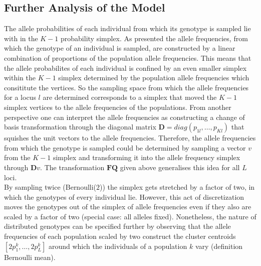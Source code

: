 \documentclass[a4paper, 11pt]{article}
\begin{document}
\subsection{Further Analysis of the Model}
The allele probabilities of each individual from which its genotype is sampled lie with in the $K-1$ probability simplex. As presented the allele frequencies, from which the genotype of an individual is sampled, are constructed by a linear combination of proportions of the population allele frequencies. This means that the allele probabilites of each individual is confined by an even smaller simplex within the $K-1$ simplex determined by the population allele frequencies which consititute the vertices. So the sampling space from which the allele frequencies for a locus $l$ are determined corresponds to a simplex that moved the $K-1$ simplex vertices to the allele frequencies of the populations. From another perspective one can interpret the allele frequencies as constructing a change of basis transformation through the diagonal matrix $\mathbf{D} = diag(p_{1l}, \ldots, p_{Kl})$ that squishes the unit vectors to the allele frequencies. Therefore, the allele frequencies from which the genotype is sampled could be determined by sampling a vector $v$ from the $K-1$ simplex and transforming it into the allele frequency simplex through $\mathbf{D}v$.  The transformation $\mathbf{F}\mathbf{Q}$ given above generalises this idea for all $L$ loci.\\
By sampling twice (Bernoulli($2$)) the simplex gets stretched by a factor of two, in which the genotypes of every individual lie. However, this act of discretization moves the genotypes out of the simplex of allele frequencies even if they also are scaled by a factor of two (special case: all alleles fixed). Nonetheless, the nature of distributed genotypes can be specified further by observing that the allele frequencies of each population scaled by two construct the cluster centroids $[2p^k_1, \ldots, 2p^k_L]$ around which the individuals of a population $k$ vary (definition Bernoulli mean).\\
\end{document}
